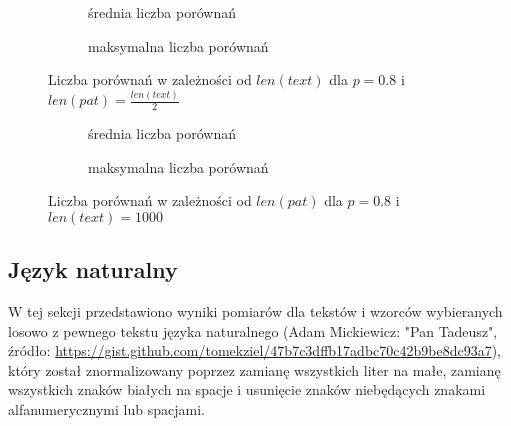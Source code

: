 \begin{figure}[htb]
    \centering
    \begin{subfigure}[b]{0.49\textwidth}
        \centering
        
        \caption{średnia liczba porównań}
        \label{fig:result_alph_geo_08_pat_len(text)2_plot_avg_100}
    \end{subfigure}
    \hfill
    \begin{subfigure}[b]{0.49\textwidth}
        \centering
        
        \caption{maksymalna liczba porównań}
        \label{fig:result_alph_geo_08_pat_len(text)2_plot_max_100}
    \end{subfigure}
    \hfill
    \caption{Liczba porównań w zależności od $len(text)$ dla $p = 0.8$ i $len(pat) = \frac{len(text)}{2}$}
    \label{fig:result_alph_geo_08_pat_len(text)2}
\end{figure}

\begin{figure}[htb]
    \centering
    \begin{subfigure}[b]{0.49\textwidth}
        \centering
        
        \caption{średnia liczba porównań}
        \label{fig:result_alph_geo_08_text_1000_plot_avg_100}
    \end{subfigure}
    \hfill
    \begin{subfigure}[b]{0.49\textwidth}
        \centering
        
        \caption{maksymalna liczba porównań}
        \label{fig:result_alph_geo_08_text_1000_plot_max_100}
    \end{subfigure}
    \hfill
    \caption{Liczba porównań w zależności od $len(pat)$ dla $p = 0.8$ i $len(text) = 1000$}
    \label{fig:result_alph_geo_08_text_1000}
\end{figure}

\FloatBarrier
\subsection{Język naturalny}
W tej sekcji przedstawiono wyniki pomiarów dla tekstów i wzorców wybieranych losowo z pewnego tekstu języka naturalnego (Adam Mickiewicz: "Pan Tadeusz", źródło: \url{https://gist.github.com/tomekziel/47b7c3dffb17adbc70c42b9be8dc93a7}), który został znormalizowany poprzez zamianę wszystkich liter na małe, zamianę wszystkich znaków białych na spacje i usunięcie znaków niebędących znakami alfanumerycznymi lub spacjami.


